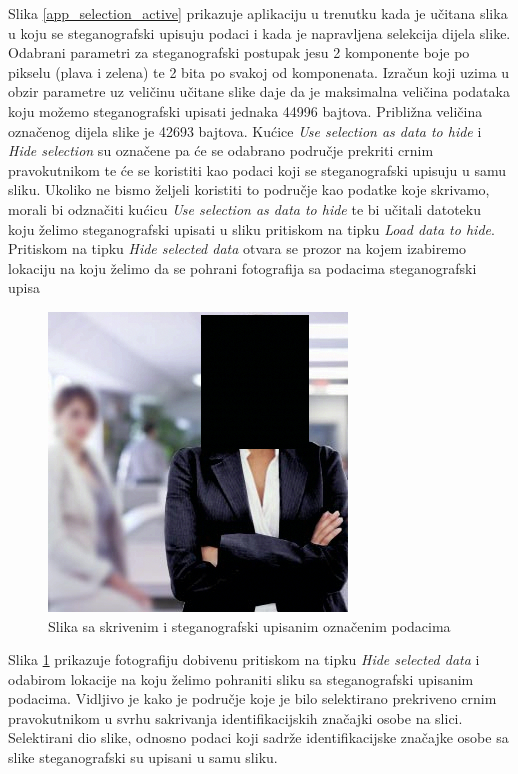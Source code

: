 \documentclass[times, utf8, seminar, numeric]{fer}
\begin{document}
Slika \ref{app_selection_active} prikazuje aplikaciju u trenutku kada je učitana slika u koju se steganografski upisuju podaci i kada je napravljena selekcija dijela slike. Odabrani parametri za steganografski postupak jesu 2 komponente boje po pikselu (plava i zelena) te 2 bita po svakoj od komponenata. Izračun koji uzima u obzir parametre uz veličinu učitane slike daje da je maksimalna veličina podataka koju možemo steganografski upisati jednaka 44996 bajtova. Približna veličina označenog dijela slike je 42693 bajtova. Kućice \textit{Use selection as data to hide} i \textit{Hide selection} su označene pa će se odabrano područje prekriti crnim pravokutnikom te će se koristiti kao podaci koji se steganografski upisuju u samu sliku. Ukoliko ne bismo željeli koristiti to područje kao podatke koje skrivamo, morali bi odznačiti kućicu \textit{Use selection as data to hide} te bi učitali datoteku koju želimo steganografski upisati u sliku pritiskom na tipku \textit{Load data to hide}. Pritiskom na tipku \textit{Hide selected data} otvara se prozor na kojem izabiremo lokaciju na koju želimo da se pohrani fotografija sa podacima steganografski upisa

\begin{figure}[H]
\caption{Slika sa skrivenim i steganografski upisanim označenim podacima}
\label{image_with_hidden}
\centerline{\includegraphics[scale=0.6]{images/image_with_hidden.png}}
\end{figure}

Slika \ref{image_with_hidden} prikazuje fotografiju dobivenu pritiskom na tipku \textit{Hide selected data} i odabirom lokacije na koju želimo pohraniti sliku sa steganografski upisanim podacima. Vidljivo je kako je područje koje je bilo selektirano prekriveno crnim pravokutnikom u svrhu sakrivanja identifikacijskih značajki osobe na slici. Selektirani dio slike, odnosno podaci koji sadrže identifikacijske značajke osobe sa slike steganografski su upisani u samu sliku.
\end{document}
